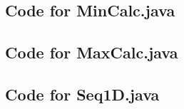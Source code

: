 \documentclass[12pt,fleqn]{examtst}
\begin{document}
\noindent 

\newpage

\subsection*{Code for MinCalc.java}

\noindent 

\newpage

\subsection*{Code for MaxCalc.java}

\noindent 

\newpage

\subsection*{Code for Seq1D.java}

\noindent 

\newpage

\end{document}
